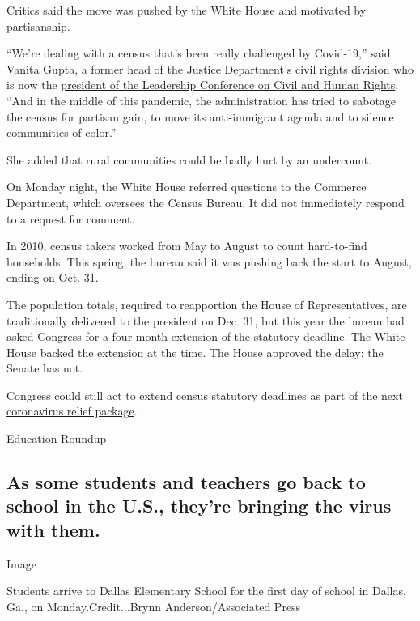 Critics said the move was pushed by the White House and motivated by
partisanship.

``We're dealing with a census that's been really challenged by
Covid-19,'' said Vanita Gupta, a former head of the Justice Department's
civil rights division who is now the
\href{https://civilrights.org/about/our-staff/vanita-gupta/}{president
of the Leadership Conference on Civil and Human Rights}. ``And in the
middle of this pandemic, the administration has tried to sabotage the
census for partisan gain, to move its anti-immigrant agenda and to
silence communities of color.''

She added that rural communities could be badly hurt by an undercount.

On Monday night, the White House referred questions to the Commerce
Department, which oversees the Census Bureau. It did not immediately
respond to a request for comment.

In 2010, census takers worked from May to August to count hard-to-find
households. This spring, the bureau said it was pushing back the start
to August, ending on Oct. 31.

The population totals, required to reapportion the House of
Representatives, are traditionally delivered to the president on Dec.
31, but this year the bureau had asked Congress for a
\href{https://www.nytimes.com/2020/04/13/us/census-coronavirus-delay.html?searchResultPosition=9}{four-month
extension of the statutory deadline}. The White House backed the
extension at the time. The House approved the delay; the Senate has not.

Congress could still act to extend census statutory deadlines as part of
the next
\href{https://www.nytimes.com/2020/08/02/us/politics/coronavirus-jobless-aid.html}{coronavirus
relief package}.

Education Roundup

\hypertarget{as-some-students-and-teachers-go-back-to-school-in-the-us-theyre-bringing-the-virus-with-them}{%
\subsection{As some students and teachers go back to school in the U.S.,
they're bringing the virus with
them.}\label{as-some-students-and-teachers-go-back-to-school-in-the-us-theyre-bringing-the-virus-with-them}}

Image

Students arrive to Dallas Elementary School for the first day of school
in Dallas, Ga., on Monday.Credit...Brynn Anderson/Associated Press

